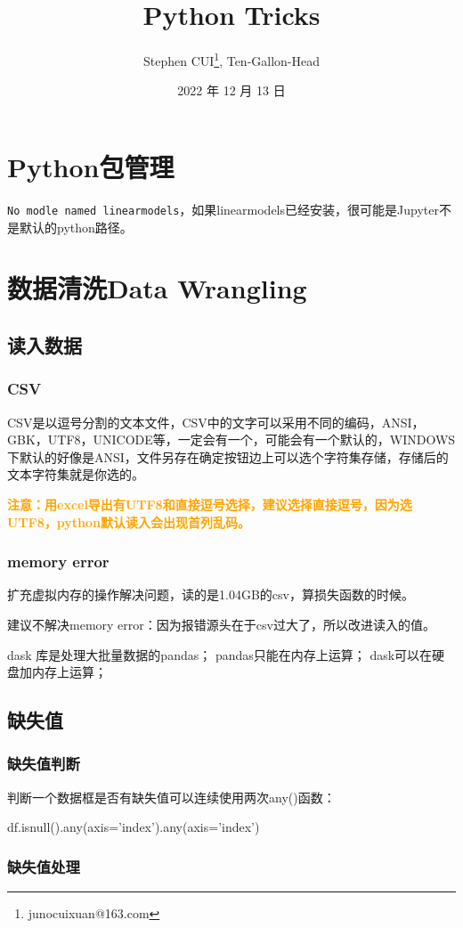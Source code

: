 \documentclass[openany]{book}
\title{Python Tricks}
\author{Stephen CUI\thanks{junocuixuan@163.com}, Ten-Gallon-Head}
\date{2022 年 12 月 13 日}
\newcommand\warning[1]{\textbf{\textcolor{orange}{#1}}}
\begin{document}
\maketitle
\chapter{Python包管理}
\verb|No modle named linearmodels|，如果linearmodels已经安装，很可能是Jupyter不是默认的python路径。
\chapter{数据清洗Data Wrangling}
\section{读入数据}
\subsection{CSV}
CSV是以逗号分割的文本文件，CSV中的文字可以采用不同的编码，ANSI，GBK，UTF8，UNICODE等，一定会有一个，可能会有一个默认的，WINDOWS下默认的好像是ANSI，文件另存在确定按钮边上可以选个字符集存储，存储后的文本字符集就是你选的。

\warning{注意：用excel导出有UTF8和直接逗号选择，建议选择直接逗号，因为选UTF8，python默认读入会出现首列乱码。}
\subsection{memory error}
扩充虚拟内存的操作解决问题，读的是1.04GB的csv，算损失函数的时候。

建议不解决memory error：因为报错源头在于csv过大了，所以改进读入的值。

dask 库是处理大批量数据的pandas；
pandas只能在内存上运算；
dask可以在硬盘加内存上运算；
\section{缺失值}
\subsection{缺失值判断}
判断一个数据框是否有缺失值可以连续使用两次any()函数：
\begin{pyc}
df.isnull().any(axis='index').any(axis='index')
\end{pyc}
\subsection{缺失值处理}
\end{document}
